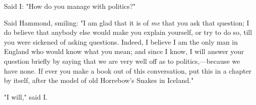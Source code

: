 Said I: "How do you manage with politics?"

Said Hammond, smiling: "I am glad that it is of \emph{me} that you ask
that question; I do believe that anybody else would make you explain
yourself, or try to do so, till you were sickened of asking questions.
Indeed, I believe I am the only man in England who would know what you
mean; and since I know, I will answer your question briefly by saying
that we are very well off as to politics,---because we have none. If
ever you make a book out of this conversation, put this in a chapter by
itself, after the model of old Horrebow's Snakes in Iceland."

"I will," said I.
